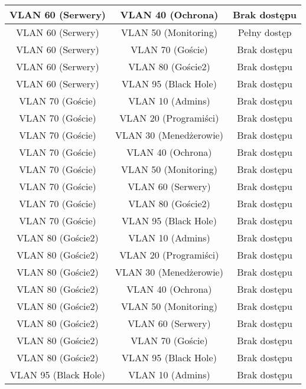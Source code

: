 \begin{table}[htbp]
\begin{tabular}{|c|c|c|}
VLAN 60 (Serwery)      & VLAN 40 (Ochrona)      & Brak dostępu         \\ \hline
VLAN 60 (Serwery)      & VLAN 50 (Monitoring)   & Pełny dostęp         \\ \hline
VLAN 60 (Serwery)      & VLAN 70 (Goście)       & Brak dostępu         \\ \hline
VLAN 60 (Serwery)      & VLAN 80 (Goście2)      & Brak dostępu         \\ \hline
VLAN 60 (Serwery)      & VLAN 95 (Black Hole)   & Brak dostępu         \\ \hline
VLAN 70 (Goście)       & VLAN 10 (Admins)       & Brak dostępu         \\ \hline
VLAN 70 (Goście)       & VLAN 20 (Programiści)  & Brak dostępu         \\ \hline
VLAN 70 (Goście)       & VLAN 30 (Menedżerowie) & Brak dostępu         \\ \hline
VLAN 70 (Goście)       & VLAN 40 (Ochrona)      & Brak dostępu         \\ \hline
VLAN 70 (Goście)       & VLAN 50 (Monitoring)   & Brak dostępu         \\ \hline
VLAN 70 (Goście)       & VLAN 60 (Serwery)      & Brak dostępu         \\ \hline
VLAN 70 (Goście)       & VLAN 80 (Goście2)      & Brak dostępu         \\ \hline
VLAN 70 (Goście)       & VLAN 95 (Black Hole)   & Brak dostępu         \\ \hline
VLAN 80 (Goście2)      & VLAN 10 (Admins)       & Brak dostępu         \\ \hline
VLAN 80 (Goście2)      & VLAN 20 (Programiści)  & Brak dostępu         \\ \hline
VLAN 80 (Goście2)      & VLAN 30 (Menedżerowie) & Brak dostępu         \\ \hline
VLAN 80 (Goście2)      & VLAN 40 (Ochrona)      & Brak dostępu         \\ \hline
VLAN 80 (Goście2)      & VLAN 50 (Monitoring)   & Brak dostępu         \\ \hline
VLAN 80 (Goście2)      & VLAN 60 (Serwery)      & Brak dostępu         \\ \hline
VLAN 80 (Goście2)      & VLAN 70 (Goście)       & Brak dostępu         \\ \hline
VLAN 80 (Goście2)      & VLAN 95 (Black Hole)   & Brak dostępu         \\ \hline
VLAN 95 (Black Hole)   & VLAN 10 (Admins)       & Brak dostępu         \\ \hline

\end{tabular}
\end{table}
